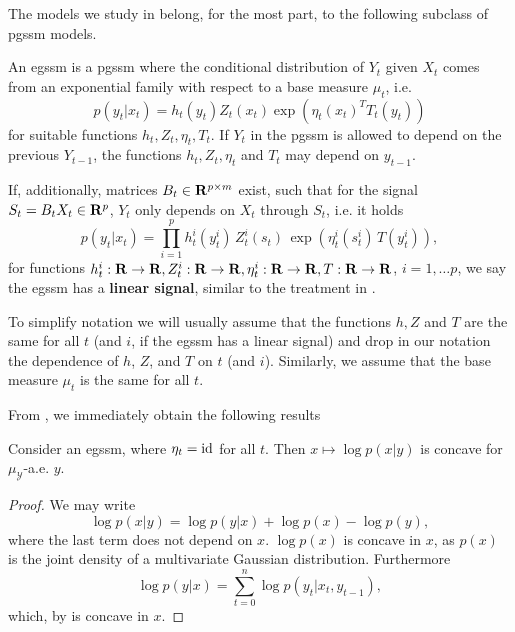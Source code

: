 The models we study in  belong, for the most part, to the following subclass of \acrshort{pgssm} models.
\begin{definition}
    \label{def:egssm}
    An \acrfull{egssm} is a \acrshort{pgssm} where the conditional distribution of $Y_{t}$ given $X_{t}$ comes from an exponential family with respect to a base measure $\mu_{t}$, i.e.
    $$
    p (y_{t}|x_{t}) = h_{t}(y_{t}) Z_{t}(x_{t}) \exp \left( \eta_{t}(x_{t})^{T} T_{t}(y_{t}) \right)
    $$
    for suitable functions $h_{t}, Z_{t}, \eta_{t}, T_{t}$. If $Y_{t}$ in the \acrshort{pgssm} is allowed to depend on the previous $Y_{t - 1}$, the functions $h_{t}, Z_{t}, \eta_{t}$ and $T_{t}$ may depend on $y_{t - 1}$. 

    If, additionally, matrices $B_{t} \in \mathbf R^{p \times m}$ exist, such that for the signal $S_{t} = B_{t}X_{t} \in \mathbf R^{p}$, $Y_{t}$ only depends on $X_{t}$ through $S_{t}$, i.e. it holds
    $$
    p(y_{t}|x_{t}) = \prod_{i = 1}^p h^{i}_{t}(y^{i}_{t})\, Z^{i}_{t} (s_{t})\, \exp \left( \eta^{i}_{t} (s^{i}_{t})\,T(y^{i}_{t}) \right),
    $$
    for functions $h_{t}^{i}: \mathbf R \to \mathbf R, Z^{i}_{t}: \mathbf R \to \mathbf R, \eta^{i}_{t}: \mathbf R\to\mathbf R, T: \mathbf R\to\mathbf R$, $i = 1, \dots p$, we say the \gls{egssm} has a \textbf{linear signal}, similar to the treatment in \citep[Part II]{Durbin2012Time}.
\end{definition}

\begin{remark}
    To simplify notation we will usually assume that the functions $h, Z$ and $T$ are the same for all $t$ (and $i$, if the \gls{egssm} has a linear signal) and drop in our notation the dependence of $h$, $Z$, and $T$ on $t$ (and $i$). Similarly, we assume that the base measure $\mu_t$ is the same for all $t$.
\end{remark}

From , we immediately obtain the following results \citep[Section 10.6.4]{Durbin2012Time}
\begin{lemma}
    Consider an \acrshort{egssm}, where $\eta_{t} = \operatorname{id}$ for all $t$.  Then $x \mapsto \log p(x|y)$ is concave for $\mu_{\mathcal Y}$-a.e. $y$. 
\end{lemma}
\begin{proof}
    We may write
    $$
    \log p(x|y) = \log p(y|x) + \log p(x) - \log p(y),
    $$
    where the last term does not depend on $x$. $\log p(x)$ is concave in $x$, as $p(x)$ is the joint density of a multivariate Gaussian distribution. Furthermore 
    $$
    \log p(y | x) = \sum_{t = 0}^n \log p(y_{t} | x_{t}, y_{t - 1}),
    $$
    which, by  is concave in $x$. 
\end{proof}

